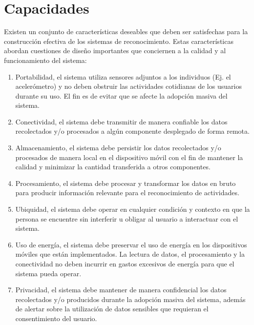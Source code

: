 \section{Capacidades}

Existen un conjunto de características deseables que deben ser satisfechas
para la construcción efectiva de los sistemas de reconocimiento. Estas
características abordan cuestiones de diseño importantes que conciernen
a la calidad y al funcionamiento del sistema:
\begin{enumerate}
\item Portabilidad, el sistema utiliza sensores adjuntos a los individuos
(Ej. el acelerómetro) y no deben obstruir las actividades cotidianas
de los usuarios durante su uso. El fin es de evitar que se afecte
la adopción masiva del sistema. 
\item Conectividad, el sistema debe transmitir de manera confiable los datos
recolectados y/o procesados a algún componente desplegado de forma
remota. 
\item Almacenamiento, el sistema debe persistir los datos recolectados y/o
procesados de manera local en el dispositivo móvil con el fin de mantener
la calidad y minimizar la cantidad transferida a otros componentes.
\item Procesamiento, el sistema debe procesar y transformar los datos en
bruto para producir información relevante para el reconocimiento de
actividades.
\item Ubiquidad, el sistema debe operar en cualquier condición y contexto
en que la persona se encuentre sin interferir u obligar al usuario
a interactuar con el sistema.
\item Uso de energía, el sistema debe preservar el uso de energía en los
dispositivos móviles que están implementados. La lectura de datos,
el procesamiento y la conectividad no deben incurrir en gastos excesivos
de energía para que el sistema pueda operar.
\item Privacidad, el sistema debe mantener de manera confidencial los datos
recolectados y/o producidos durante la adopción masiva del sistema,
además de alertar sobre la utilización de datos sensibles que requieran
el consentimiento del usuario.
\end{enumerate}

